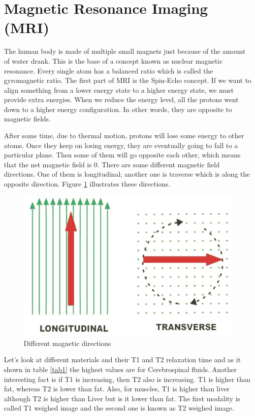 \section{Magnetic Resonance Imaging (MRI)}

The human body is made of multiple small magnets just because of the amount of water drank. This is the base of a concept known as nuclear magnetic resonance. Every single atom has a balanced ratio which is called the gyromagnetic ratio. The first part of MRI is the Spin-Echo concept. If we want to align something from a lower energy state to a higher energy state, we must provide extra energies. When we reduce the energy level, all the protons went down to a higher energy configuration. In other words, they are opposite to magnetic fields.

After some time, due to thermal motion, protons will lose some energy to other atoms. Once they keep on losing energy, they are eventually going to fall to a particular plane. Then some of them will go opposite each other, which means that the net magnetic field is 0. There are some different magnetic field directions. One of them is longitudinal; another one is traverse which is along the opposite direction. Figure \ref{fig9} illustrates these directions.

\begin{figure}[htbp]
	\centering \includegraphics[width=0.55\columnwidth]{./figures/Fig9.jpg}
	\caption{Different magnetic directions}
	\label{fig9}
\end{figure}

Let’s look at different materials and their T1 and T2 relaxation time and as it shown in table \ref{tab1} the highest values are for Cerebrospinal fluids. Another interesting fact is if T1 is increasing, then T2 also is increasing. T1 is higher than fat, whereas T2 is lower than fat. Also, for muscles, T1 is higher than liver although T2 is higher than Liver but is it lower than fat. The first modality is called T1 weighed image and the second one is known as T2 weighed image.

